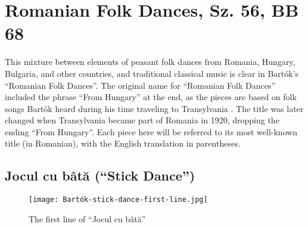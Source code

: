 \section{Romanian Folk Dances, Sz. 56, BB 68}

This mixture between elements of peasant folk dances from Romania, Hungary, Bulgaria, and other countries, and traditional classical music is clear in Bartók's ``Romanian Folk Dances''. The original name for ``Romanian Folk Dances'' included the phrase ``From Hungary'' at the end, as the pieces are based on folk songs Bartók heard during his time traveling to Transylvania \autocite{Burkholder_Grout_Palisca_2014}. The title was later changed when Transylvania became part of Romania in 1920, dropping the ending ``From Hungary''. Each piece here will be referred to its most well-known title (in Romanian), with the English translation in parentheses.

\subsection{Jocul cu bâtă (``Stick Dance'')}

\begin{figure}
  \centering
  \texttt{[image: Bartók-stick-dance-first-line.jpg]}
  \caption[The first line of ``Jocul cu bâtă'' of Bartók's \textit{Romanian Folk Dances} Sz. 56, BB 68]{The first line of ``Jocul cu bâtă''}
  \label{fig:Bartók-stick-dance-first-line}
\end{figure}


